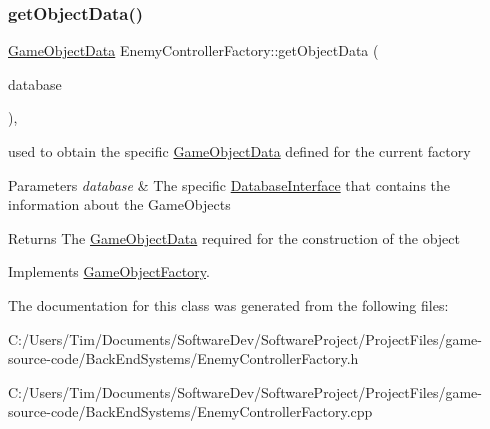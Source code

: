\subsubsection{\texorpdfstring{get\+Object\+Data()}{getObjectData()}}
{\footnotesize\ttfamily \hyperlink{struct_game_object_data}{Game\+Object\+Data} Enemy\+Controller\+Factory\+::get\+Object\+Data (\begin{DoxyParamCaption}\item[{const std\+::shared\+\_\+ptr$<$ \hyperlink{class_database_interface}{Database\+Interface} $>$ \&}]{database }\end{DoxyParamCaption})\hspace{0.3cm}{\ttfamily [override]}, {\ttfamily [virtual]}}



used to obtain the specific \hyperlink{struct_game_object_data}{Game\+Object\+Data} defined for the current factory 


\begin{DoxyParams}{Parameters}
{\em database} & The specific \hyperlink{class_database_interface}{Database\+Interface} that contains the information about the Game\+Objects \\
\hline
\end{DoxyParams}
\begin{DoxyReturn}{Returns}
The \hyperlink{struct_game_object_data}{Game\+Object\+Data} required for the construction of the object 
\end{DoxyReturn}


Implements \hyperlink{class_game_object_factory_ae9358fbb3ef2d3b127320341760d3ff9}{Game\+Object\+Factory}.



The documentation for this class was generated from the following files\+:\begin{DoxyCompactItemize}
\item 
C\+:/\+Users/\+Tim/\+Documents/\+Software\+Dev/\+Software\+Project/\+Project\+Files/game-\/source-\/code/\+Back\+End\+Systems/Enemy\+Controller\+Factory.\+h\item 
C\+:/\+Users/\+Tim/\+Documents/\+Software\+Dev/\+Software\+Project/\+Project\+Files/game-\/source-\/code/\+Back\+End\+Systems/Enemy\+Controller\+Factory.\+cpp\end{DoxyCompactItemize}
